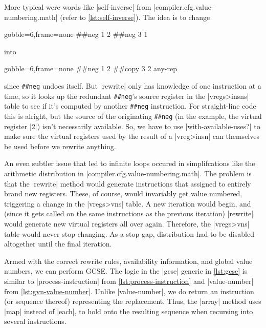 More typical were words like \factor|self-inverse| from
\factor|compiler.cfg.value-numbering.math| (refer to \vref{lst:self-inverse}).
The idea is to change
%
\begin{center}
  \begin{minipage}{0.2\linewidth}
    \begin{factorcode*}{gobble=6,frame=none}
      ##neg 1 2
      ##neg 3 1
    \end{factorcode*}
  \end{minipage}
\end{center}
%
\noindent into
%
\begin{center}
  \begin{minipage}{0.2\linewidth}
    \begin{factorcode*}{gobble=6,frame=none}
      ##neg 1 2
      ##copy 3 2 any-rep
    \end{factorcode*}
  \end{minipage}
\end{center}
%
\noindent since \Verb|##neg| undoes itself.  But \factor|rewrite| only has
knowledge of one instruction at a time, so it looks up the redundant
\Verb|##neg|'s source register in the \factor|vregs>insns| table to see if
it's computed by another \Verb|##neg| instruction.  For straight-line code this
is alright, but the source of the originating \Verb|##neg| (in the example, the
virtual register \factor|2|) isn't necessarily available.  So, we have to use
\factor|with-available-uses?| to make sure the virtual registers used by the
result of a \factor|vreg>insn| can themselves be used before we rewrite
anything.

An even subtler issue that led to infinite loops occured in simplifcations like
the arithmetic distribution in \factor|compiler.cfg.value-numbering.math|.  The
problem is that the \factor|rewrite| method would generate instructions that
assigned to entirely brand new registers.  These, of course, would invariably
get value numbered, triggering a change in the \factor|vregs>vns| table.  A new
iteration would begin, and (since it gets called on the same instructions as
the previous iteration) \factor|rewrite| would generate new virtual registers
all over again.  Therefore, the \factor|vregs>vns| table would never stop
changing.  As a stop-gap, distribution had to be disabled altogether until the
final iteration.


Armed with the correct rewrite rules, availability information, and global
value numbers, we can perform \gls{GCSE}.  The logic in the \factor|gcse|
generic in \vref{lst:gcse} is similar to \factor|process-instruction| from
\vref{lst:process-instruction} and \factor|value-number| from
\vref{lst:gvn-value-number}.  Unlike \factor|value-number|, we do return an
instruction (or sequence thereof) representing the replacement.  Thus, the
\factor|array| method uses \factor|map| instead of \factor|each|, to hold onto
the resulting sequence when recursing into several instructions.

